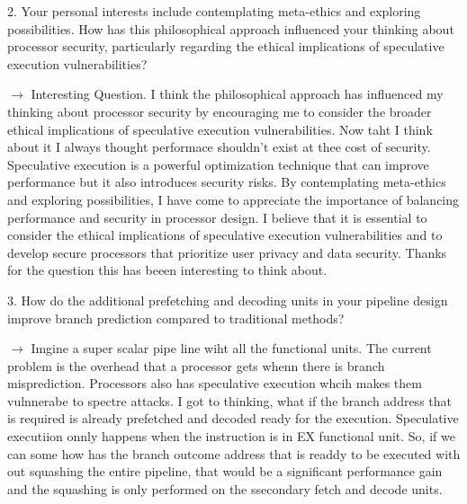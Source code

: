 2. Your personal interests include contemplating meta-ethics and exploring possibilities. How has this philosophical approach influenced your thinking about processor security, particularly regarding the ethical implications of speculative execution vulnerabilities?

$\longrightarrow$ Interesting Question. I think the philosophical approach has influenced my thinking about processor security by encouraging me to consider the broader ethical implications of speculative execution vulnerabilities. Now taht I think about it I always thought performace shouldn't exist at thee cost of security.
Speculative execution is a powerful optimization technique that can improve performance but it also introduces security risks. By contemplating meta-ethics and exploring possibilities, I have come to appreciate the importance of balancing performance and security in processor design. I believe that it is essential to consider the ethical implications of speculative execution vulnerabilities and to develop secure processors that prioritize user privacy and data security.
Thanks for the question this has beeen interesting to think about. 

3. How do the additional prefetching and decoding units in your pipeline design improve branch prediction compared to traditional methods?

$\longrightarrow$ Imgine a super scalar pipe line wiht all the functional units. The current problem is the overhead that a processor gets whenn there is branch misprediction. Processors also has speculative execution whcih makes them vulnnerabe to spectre attacks. 
I got to thinking, what if the branch address that is required is already prefetched and decoded ready for the execution. Speculative executiion onnly happens when the instruction is in EX functional unit. So, if we can some how has the branch outcome address that is readdy to be executed with out squashing the entire pipeline, that would be a significant performance gain and the squashing is only performed on the ssecondary fetch and decode units. 